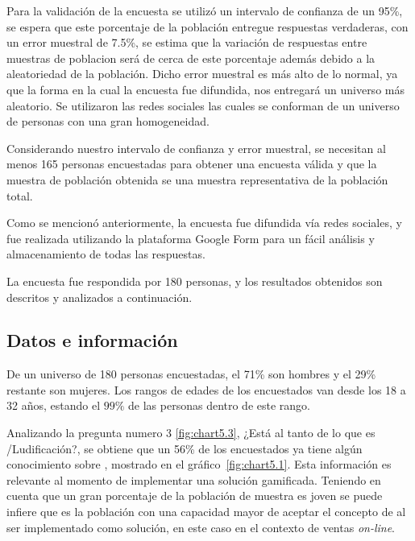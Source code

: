 Para la validación de la encuesta se utilizó un intervalo de confianza de un 95\%,
se espera que este porcentaje de la población entregue respuestas verdaderas,
con un error muestral de 7.5\%, se estima que la variación de respuestas entre
muestras de poblacion será de cerca de este porcentaje además debido a la
aleatoriedad de la población.
Dicho error muestral es más alto de lo normal, ya que la forma en la cual la
encuesta fue difundida, nos entregará un universo más aleatorio.
Se utilizaron las redes sociales las cuales se conforman de un universo de personas
con una gran homogeneidad.

Considerando nuestro intervalo de confianza y error muestral,
se necesitan al menos 165 personas encuestadas para obtener una encuesta válida
y que la muestra de población obtenida se una muestra representativa de la
población total.

Como se mencionó anteriormente, la encuesta fue difundida vía redes sociales,
y fue realizada utilizando la plataforma Google Form para un fácil análisis y
almacenamiento de todas las respuestas.

La encuesta fue respondida por 180 personas, y los resultados obtenidos son
descritos y analizados a continuación.

\subsection{Datos e información}

De un universo de 180 personas encuestadas, el 71\% son hombres y el 29\%
restante son mujeres.
Los rangos de edades de los encuestados van desde los 18 a 32 años,
estando el $99\%$ de las personas dentro de este rango.

Analizando la pregunta numero $3$ \ref{fig:chart5.3},
¿Está al tanto de lo que es {\GAM}/Ludificación?, se obtiene que  un 56\% de los
encuestados ya tiene algún conocimiento sobre {\GAM}, mostrado en el
gráfico~\ref{fig:chart5.1}.
Esta información es relevante al momento de implementar una solución gamificada.
Teniendo en cuenta que un gran porcentaje de la población de muestra es joven
se puede infiere que es la población con una capacidad mayor de aceptar el
concepto de {\GAM} al ser implementado como solución, en este caso en el
contexto de ventas \emph{on-line}.

